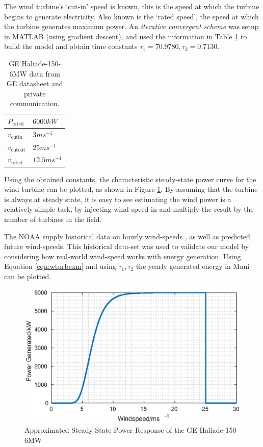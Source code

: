 The wind turbine's `cut-in' speed is known, this is the speed at which the turbine begins to generate electricity.
Also known is the `rated speed', the speed at which the turbine generates maximum power.
An \emph{iterative convergent scheme} was setup in MATLAB (using gradient descent), and used the information in Table \ref{tbl:haliade} to build the model and obtain time constants $\tau_1 = 70.9780,\tau_2 = 0.7130$.
%
\begin{table}[bh]
        \centering
        \begin{tabular}{||l | l||}
                \hline
                $P_{\text{rated}}$ & $6000kW$\\
                \hline
                $v_{\text{cutin}}$ & $3ms^{-1}$\\
                \hline
                $v_{\text{cutout}}$ & $25ms^{-1}$\\
                \hline
                $v_{\text{rated}}$ & $12.5ms^{-1}$\\
                \hline
        \end{tabular}
        \caption{GE Haliade-150-6MW data from GE datasheet and private communication. \cite{power:wturbdata}} \label{tbl:haliade}
\end{table}

Using the obtained constants, the characteristic steady-state power curve for the wind turbine can be plotted, as shown in Figure \ref{fig:wturb}.
By assuming that the turbine is always at steady state, it is easy to see estimating the wind power is a relatively simple task, by injecting wind speed in and multiply the result by the number of turbines in the field.

The NOAA supply historical data on hourly wind-speeds \cite{power:NOAA}, as well as predicted future wind-speeds.
This historical data-set was used to validate our model by considering how real-world wind-speed works with energy generation.
Using Equation \ref{eqn:wturbexm} and using $\tau_1, \tau_2$ the yearly generated energy in Maui can be plotted.
           \begin{figure}[bht]
                   \centering
                   \includegraphics[scale=0.6]{./images/turbine.eps}
                   \caption{Approximated Steady State Power Response of the GE Haliade-150-6MW} \label{fig:wturb}
           \end{figure}


